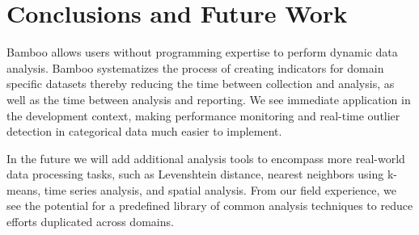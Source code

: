 \documentclass{acm_proc_article-sp}
\begin{document}

%
%

\section{Conclusions and Future Work}
Bamboo allows users without programming expertise to perform dynamic data analysis.  Bamboo systematizes the process of creating indicators for domain specific datasets thereby reducing the time between collection and analysis, as well as the time between analysis and reporting.
We see immediate application in the development context, making performance monitoring \cite{berg} and real-time outlier detection in categorical data \cite{dimagi} much easier to implement. 

In the future we will add additional analysis tools to encompass more real-world data processing tasks, such as Levenshtein distance, nearest neighbors using k-means, time series analysis, and spatial analysis.  
From our field experience, we see the potential for a predefined library of common analysis techniques to reduce
efforts duplicated across domains.


%

%
%

\balancecolumns
\end{document}
